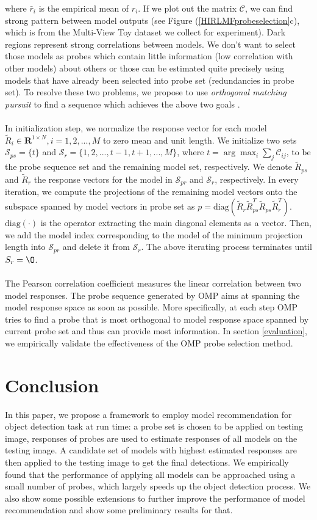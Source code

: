 \documentclass{article} %
\begin{document}
where $\bar{r}_i$ is the empirical mean of $r_i$. If we plot out the matrix $\mathcal{C}$, we can find strong pattern between model outputs (see Figure (\ref{HIRLMFprobeselection}c), which is from the Multi-View Toy dataset we collect for experiment). Dark regions represent strong correlations between models. We don't want to select those models as probes which contain little information (low correlation with other models) about others or those can be estimated quite precisely using models that have already been selected into probe set (redundancies in probe set). To resolve these two problems, we propose to use \emph{orthogonal matching pursuit} to find a sequence which achieves the above two goals \cite{cois1995matching}.\\\\
In initialization step, we normalize the response vector for each model $\tilde{R}_i{\in}\mathbf{R}^{1{\times}N},i=1,2,...,M$ to zero mean and unit length. We initialize two sets $\mathcal{S}_{ps}=\{t\}$ and $\mathcal{S}_r=\{1,2,...,t-1,t+1,...,M\}$, where $t=\arg\max_i\sum_j\mathcal{C}_{ij}$, to be the probe sequence set and the remaining model set, respectively. We denote $\tilde{R}_{ps}$ and $\tilde{R}_r$ the response vectors for the model in $\mathcal{S}_{pr}$ and $\mathcal{S}_r$, respectively. In every iteration, we compute the projections of the remaining model vectors onto the subspace spanned by model vectors in probe set as $p=\text{diag}(\tilde{R}_{r}\tilde{R}_{ps}^T\tilde{R}_{ps}\tilde{R}_r^T)$. $\text{diag}(\cdot)$ is the operator extracting the main diagonal elements as a vector. Then, we add the model index corresponding to the model of the minimum projection length into $\mathcal{S}_{pr}$ and delete it from $\mathcal{S}_r$. The above iterating process terminates until $S_r={\O}$.\\\\
The Pearson correlation coefficient measures the linear correlation between two model responses. The probe sequence generated by OMP aims at spanning the model response space as soon as possible. More specifically, at each step OMP tries to find a probe that is most orthogonal to model response space spanned by current probe set and thus can provide most information. In section \ref{evaluation}, we empirically validate the effectiveness of the OMP probe selection method.


\section{Conclusion}
In this paper, we propose a framework to employ model recommendation for object detection task at run time: a probe set is chosen to be applied on testing image, responses of probes are used to estimate responses of all models on the testing image. A candidate set of models with highest estimated responses are then applied to the testing image to get the final detections. We empirically found that the performance of applying all models can be approached using a small number of probes, which largely speeds up the object detection process. We also show some possible extensions to further improve the performance of model recommendation and show some preliminary results for that.
\end{document}
